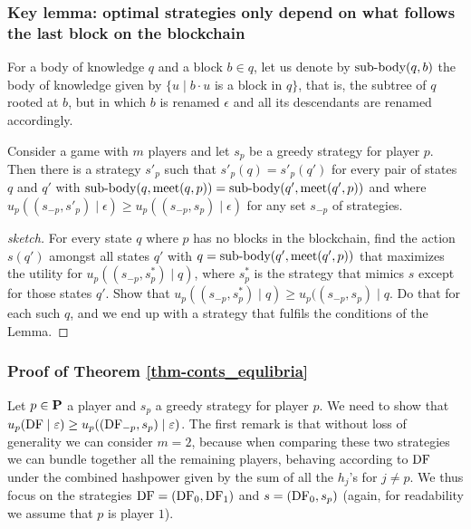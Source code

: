 \subsubsection{Key lemma: optimal strategies only depend on what follows the last block on the blockchain}

For a body of knowledge $q$ and a block $b \in q$, let us denote by ${\text{\rm sub-body}}(q,b)$ the body of knowledge 
given by $\{u \mid b\cdot u$ is a block in $q\}$, that is, the subtree of $q$ rooted at $b$, but in which $b$ is renamed 
$\epsilon$ and all its descendants are renamed accordingly. 

\begin{mylem}
\label{lem-meet}
Consider a game with $m$ players and let $s_p$ be a greedy strategy for player $p$. Then there is a strategy $s'_p$ such that $s'_p(q) = s'_p(q')$ 
for every pair of states $q$ and $q'$ with ${\text{\rm sub-body}}(q,\text{\rm meet}(q,p)) = {\text{\rm sub-body}}(q',\text{\rm meet}(q',p))$ and where 
$u_p((s_{-p},s'_p) \mid \epsilon) \geq u_p((s_{-p},s_p) \mid \epsilon)$ for any set $s_{-p}$ of strategies. 
\end{mylem}
\begin{proof}[sketch]
For every state $q$ where $p$ has no blocks in the blockchain, find the action $s(q')$ amongst all states $q'$ with 
$q = {\text{\rm sub-body}}(q',\text{\rm meet}(q',p))$ that maximizes the utility for $u_p((s_{-p},s^*_p) \mid q)$, where $s^*_p$ is the strategy that mimics 
$s$ except for those states $q'$. Show that $u_p((s_{-p},s^*_p) \mid q) \geq u_p((s_{-p},s_p) \mid q$. Do that for each such $q$, 
and we end up with a strategy that fulfils the conditions of the Lemma. 
\end{proof}

\subsubsection{Proof of Theorem \ref{thm-conts_equlibria}} 

Let $p \in \mathbf{P}$ a player and $s_p$ a greedy strategy for player $p$. We need to show that 
$u_p(\text{\rm DF} \mid \varepsilon) \geq u_p( (\text{\rm DF}_{-p},s_p) \mid \varepsilon)$. The first remark is that without loss of generality we can consider 
$m = 2$, because when comparing these two strategies we can bundle together all the remaining players, behaving according to $\text{\rm DF}$ 
under the combined hashpower given by the sum of all the $h_j$'s for $j \neq p$. We thus focus on the strategies 
$\text{\rm DF} = (\text{\rm DF}_0,\text{\rm DF}_1)$ and $s = (\text{\rm DF}_0,s_p)$ (again, for readability we assume that $p$ is player $1$). 

